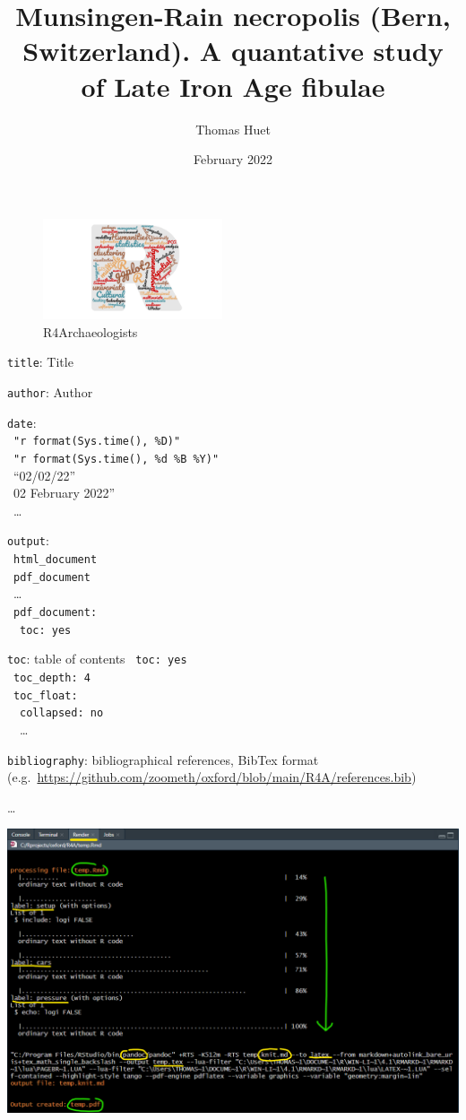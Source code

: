 \documentclass[
]{article}
\title{Munsingen-Rain necropolis (Bern, Switzerland). A quantative study of Late Iron Age fibulae}
\author{Thomas Huet}
\date{February 2022}
\begin{document}
\maketitle

{
\setcounter{tocdepth}{2}
\tableofcontents
}
\begin{figure}
\centering
\includegraphics[width=2.08333in,height=\textheight]{www/logo.png}
\caption{R4Archaeologists}
\end{figure}

\texttt{title}: Title

\texttt{author}: Author

\texttt{date}:\\
 \texttt{"\textquotesingle{}r\ format(Sys.time(),\ \textquotesingle{}\%D\textquotesingle{})\textquotesingle{}"}\\
 \texttt{"\textquotesingle{}r\ format(Sys.time(),\ \textquotesingle{}\%d\ \%B\ \%Y\textquotesingle{})\textquotesingle{}"}\\
 ``02/02/22''\\
 02 February 2022''\\
 \ldots{}

\texttt{output}:\\
 \texttt{html\_document}\\
 \texttt{pdf\_document}\\
 \ldots{}\\
 \texttt{pdf\_document:}\\
 \texttt{toc:\ yes}

\texttt{toc}: table of contents
 \texttt{toc:\ yes}\\
 \texttt{toc\_depth:\ 4}\\
 \texttt{toc\_float:}\\
 \texttt{collapsed:\ no}\\
 \ldots{}

\texttt{bibliography}: bibliographical references, BibTex format (e.g.~\url{https://github.com/zoometh/oxford/blob/main/R4A/references.bib})

\ldots{}

\includegraphics[width=7.29167in,height=\textheight]{www/rmd_render.png}
\end{document}
